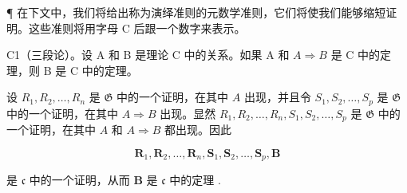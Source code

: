 ¶ 在下文中，我们将给出称为演绎准则的元数学准则，它们将使我们能够缩短证明。这些准则将用字母 C 后跟一个数字来表示。

C1（三段论）。设 A 和 B 是理论 C 中的关系。如果 A 和 \(A \Longrightarrow B\) 是 C 中的定理，则 B 是 C 中的定理。

设 \(R_1, R_2, \ldots, R_n\) 是 \(\mathfrak{G}\) 中的一个证明，在其中 \(A\) 出现，并且令 \(S_1, S_2, \ldots, S_p\) 是 \(\mathfrak{G}\) 中的一个证明，在其中 \(A \Longrightarrow B\) 出现。显然 \(R_1, R_2, \ldots, R_n, S_1, S_2, \ldots, S_p\) 是 \(\mathfrak{G}\) 中的一个证明，在其中 \(A\) 和 \(A \Longrightarrow B\) 都出现。因此

\[
\boldsymbol {R} _ {1}, \boldsymbol {R} _ {2}, \dots , \boldsymbol {R} _ {n}, \boldsymbol {S} _ {1}, \boldsymbol {S} _ {2}, \dots , \boldsymbol {S} _ {p}, \boldsymbol {B}
\]

是 \(\mathfrak{c}\) 中的一个证明，从而 \(\pmb{B}\) 是 \(\mathfrak{c}\) 中的定理 .

